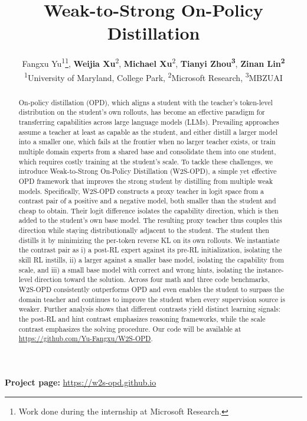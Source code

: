 \documentclass{article}
\title{Weak-to-Strong On-Policy Distillation}
\author{%
Fangxu Yu\textsuperscript{1}\thanks{Work done during the internship at Microsoft Research.},\;\;
\textbf{Weijia Xu}\textsuperscript{2}, \;\;
\textbf{Michael Xu}\textsuperscript{2}, \;\;
\textbf{Tianyi Zhou}\textsuperscript{\textbf{3}},\;\;
\textbf{Zinan Lin}\textsuperscript{\textbf{2}}
\\
\textsuperscript{1}University of Maryland, College Park,\;\;
\textsuperscript{2}Microsoft Research,\;\;
\textsuperscript{3}MBZUAI\\
}
\newcommand\ours{W2S-OPD\xspace}
\newcommand{\msheader}{\textbf{Technical Report}}
\renewcommand{\headrulewidth}{0.8pt}%
\begin{document}
\maketitle
\fancyhf{}%
\fancyhead[L]{\msheader}%
\fancyhead[R]{}%
\renewcommand{\headrulewidth}{0.8pt}%
\thispagestyle{msfirst}

\begin{center}
\vspace{-2.4em}
{ \textbf{Project page:} \url{https://w2s-opd.github.io}}
\end{center}
\vspace{0.3em}

\begin{abstract}
On-policy distillation (OPD), which aligns a student with the teacher's token-level distribution on the student's own rollouts, has become an effective paradigm for transferring capabilities across large language models (LLMs). Prevailing approaches assume a teacher at least as capable as the student, and either distill a larger model into a smaller one, which fails at the frontier when no larger teacher exists, or train multiple domain experts from a shared base and consolidate them into one student, which requires costly training at the student's scale. To tackle these challenges, we introduce Weak-to-Strong On-Policy Distillation (\ours), a simple yet effective OPD framework that improves the strong student by distilling from multiple weak models. Specifically, \ours constructs a proxy teacher in logit space from a contrast pair of a positive and a negative model, both smaller than the student and cheap to obtain.
Their logit difference isolates the capability direction, which is then added to the student's own base model. The resulting proxy teacher thus couples this direction while staying distributionally adjacent to the student. The student then distills it by minimizing the per-token reverse KL on its own rollouts. We instantiate the contrast pair as i) a post-RL expert against its pre-RL initialization, isolating the skill RL instills, ii) a larger against a smaller base model, isolating the capability from scale, and iii) a small base model with correct and wrong hints, isolating the instance-level direction toward the solution. Across four math and three code benchmarks, \ours consistently outperforms OPD and even enables the student to surpass the domain teacher and continues to improve the student when every supervision source is weaker. Further analysis shows that different contrasts yield distinct learning signals: the post-RL and hint contrast emphasizes reasoning frameworks, while the scale contrast emphasizes the solving procedure. 
Our code will be available at \href{https://github.com/Yu-Fangxu/W2S-OPD}{https://github.com/Yu-Fangxu/W2S-OPD}.

\end{abstract}
\end{document}
